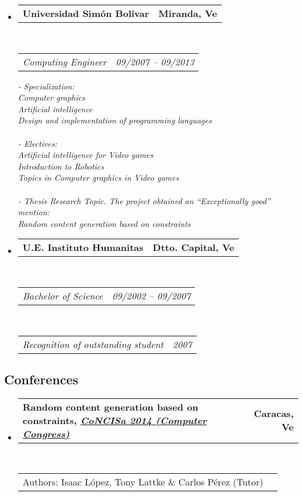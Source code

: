 \documentclass[10pt,letterpaper]{article}
\makeatletter
\newcommand{\headerrow}[2]
{\begin{tabular*}{\linewidth}{l@{\extracolsep{\fill}}r}
	#1 &
	#2 \\
\end{tabular*}}
\makeatother
\begin{document}
\begin{itemize}
	\parskip=0.1em

\item 
   \headerrow
   {\textbf{Universidad Simón Bolívar}}
   {\textbf{Miranda, Ve}}
	\\
	\headerrow
   {\emph{Computing Engineer}}
   {\emph{09/2007 -- 09/2013}}
   
   
   {\emph{- Specialization:}}
   \\
   {\emph{     Computer graphics}}
   \\
   {\emph{     Artificial intelligence}}
   \\
   {\emph{     Design and implementation of programming languages}}
   \\
   \\
   {\emph{- Electives:}}
   \\
   {\emph{     Artificial intelligence for Video games}}
   \\
   {\emph{     Introduction to Robotics}}
   \\
   {\emph{     Topics in Computer graphics in Video games}}
   \\
   \\
   {\emph{- Thesis Research Topic. The project obtained an “Exceptionally good” mention:}}
   \\
   {\emph{     Random content generation based on constraints}}

 \item 
   \headerrow
   {\textbf{U.E. Instituto Humanitas}}
   {\textbf{Dtto. Capital, Ve}}
	\\
	\headerrow
   {\emph{Bachelor of Science}}
   {\emph{09/2002 -- 09/2007}}
	\\
	\headerrow
   {\emph{Recognition of outstanding student}}
   {\emph{2007}}
\end{itemize}

\vspace{-0.4em}
\subsection*{Conferences}

\begin{itemize}
  \parskip=0.1em
\item 
   \headerrow
   {\textbf{Random content generation based on constraints, \emph{\href{http://www.concisa.net.ve/2014/}{CoNCISa 2014 (Computer Congress)}}}}
   {\textbf{Caracas, Ve}}
  \\
  \headerrow
   {Authors: Isaac López, Tony Lattke \& Carlos Pérez (Tutor)}{}
\end{itemize}
\end{document}
